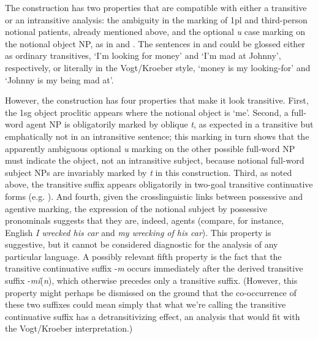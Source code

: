 \documentclass[output=paper,colorlinks,citecolor=brown]{langscibook}
\begin{document}
The construction has two properties that are compatible with
either a transitive or an intransitive analysis: the ambiguity in the
marking of 1pl and third-person notional patients, already mentioned
above, and the optional \emph{{\textltilde}u} case marking on the notional
object NP, as in  and .  The sentences in  and  could be
glossed either as ordinary transitives, `I'm looking for money' and
`I'm mad at Johnny', respectively, or literally in the Vogt/Kroeber
style, `money is my looking-for' and `Johnny is my being mad at'.


However, the construction has four properties that make it look
transitive.  First, the 1sg object proclitic appears where the
notional object is `me'.  Second, a full-word agent NP is obligatorily
marked by oblique \emph{t}, as expected in a transitive but
emphatically not in an intransitive sentence; this marking in turn
shows that the apparently ambiguous optional \emph{{\textltilde}u}
marking on the other possible full-word NP must indicate the object,
not an intransitive subject, because notional full-word subject NPs
are invariably marked by \emph{t} in this construction.  Third, as
noted above, the transitive suffix appears obligatorily in two-goal
transitive continuative forms (e.g. ).  And fourth, given the
crosslinguistic links between possessive and agentive marking, the
expression of the notional subject by possessive pronominals suggests
that they are, indeed, agents (compare, for instance, English \emph{I
wrecked his car} and \emph{my wrecking of his car}).  This property is
suggestive, but it cannot be considered diagnostic for the analysis of
any particular language.  A possibly relevant fifth property is the
fact that the transitive continuative suffix -\emph{m} occurs
immediately after the derived transitive suffix
-\emph{m\'i}(\emph{n}), which otherwise precedes only a transitive
suffix.  (However, this property might perhaps be dismissed on the
ground that the co-occurrence of these two suffixes could mean simply
that what we're calling the transitive continuative suffix has a
detransitivizing effect, an analysis that would fit with the
Vogt/Kroeber interpretation.)
\end{document}
